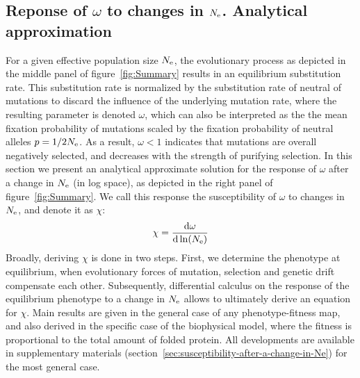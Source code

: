 \subsection{Reponse of \texorpdfstring{$\omega$}{ω} to changes in \texorpdfstring{$N_{\mathrm{e}}$}{Nₑ}. Analytical approximation}

For a given effective population size $N_{\mathrm{e}}$, the evolutionary process as depicted in the middle panel of figure~\ref{fig:Summary} results in an equilibrium substitution rate.
This substitution rate is normalized by the substitution rate of neutral of mutations to discard the influence of the underlying mutation rate, where the resulting parameter is denoted $\omega$, which can also be interpreted as the the mean fixation probability of mutations scaled by the fixation probability of neutral alleles $p = 1 / {2 N_{\mathrm{e}}}$.
As a result, $\omega < 1$ indicates that mutations are overall negatively selected, and decreases with the strength of purifying selection.
In this section we present an analytical approximate solution for the response of $\omega$ after a change in $N_{\mathrm{e}}$ (in log space), as depicted in the right panel of figure~\ref{fig:Summary}.
We call this response the susceptibility of $\omega$ to changes in $N_{\mathrm{e}}$, and denote it as $\chi$:
\begin{align}
    \chi = \frac{ \der \omega}{\der \ln (\Ne)} \label{eq:chi}
\end{align}
Broadly, deriving $\chi$ is done in two steps.
First, we determine the phenotype at equilibrium, when evolutionary forces of mutation, selection and genetic drift compensate each other.
Subsequently, differential calculus on the response of the equilibrium phenotype to a change in $N_{\mathrm{e}}$ allows to ultimately derive an equation for $\chi$.
Main results are given in the general case of any phenotype-fitness map, and also derived in the specific case of the biophysical model, where the fitness is proportional to the total amount of folded protein.
All developments are available in supplementary materials (section~\ref{sec:susceptibility-after-a-change-in-Ne}) for the most general case.

